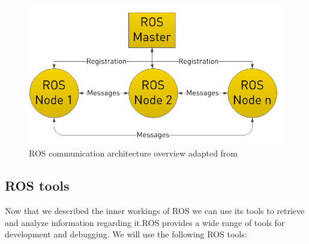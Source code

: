 \begin{figure}[ht!] 
\centerline{\includegraphics [width=0.6 \textwidth]{imgs/chapter3/rosgraph2.png}}
\caption[ROS communication architecture overview]{ROS communication architecture overview adapted from \cite{rosbasics}}
\label{fig:rosgraph}
\end{figure}


\subsection{ROS tools}
Now that we described the inner workings of \ac{ROS} we can use its tools to retrieve and analyze information regarding it.\ac{ROS} provides a wide range of tools for development and debugging. We will use the following \ac{ROS} tools:






